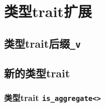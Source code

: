 \section{类型trait扩展}\label{ch21}

\subsection{类型trait后缀\texttt{\_v}}

\subsection{新的类型trait}
\subsubsection*{类型trait \texttt{is\_aggregate<>}}\label{ch21.2.1}